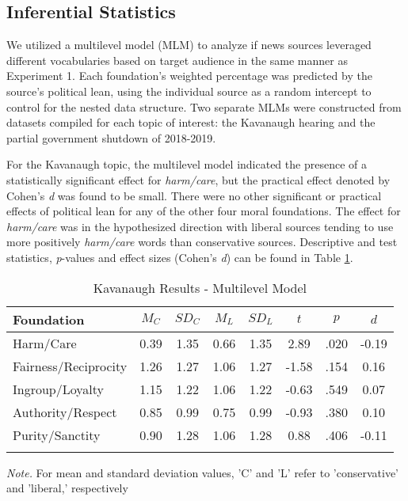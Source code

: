 \documentclass[
  english,
  man,floatsintext]{apa6}
\begin{document}
\hypertarget{inferential-statistics-1}{%
\subsection{Inferential Statistics}\label{inferential-statistics-1}}

We utilized a multilevel model (MLM) to analyze if news sources leveraged different vocabularies based on target audience in the same manner as Experiment 1. Each foundation's weighted percentage was predicted by the source's political lean, using the individual source as a random intercept to control for the nested data structure. Two separate MLMs were constructed from datasets compiled for each topic of interest: the Kavanaugh hearing and the partial government shutdown of 2018-2019.

For the Kavanaugh topic, the multilevel model indicated the presence of a statistically significant effect for \emph{harm/care}, but the practical effect denoted by Cohen's \emph{d} was found to be small. There were no other significant or practical effects of political lean for any of the other four moral foundations. The effect for \emph{harm/care} was in the hypothesized direction with liberal sources tending to use more positively \emph{harm/care} words than conservative sources. Descriptive and test statistics, \emph{p}-values and effect sizes (Cohen's \emph{d}) can be found in Table \ref{tab:exp2-tablekav}.

\begin{table}[h]

\begin{center}
\begin{threeparttable}

\caption{\label{tab:exp2-tablekav}Kavanaugh Results - Multilevel Model}

\footnotesize{

\begin{tabular}{lccccccc}
\toprule
Foundation & $M_C$ & $SD_C$ & $M_L$ & $SD_L$ & $t$ & $p$ & $d$\\
\midrule
Harm/Care & 0.39 & 1.35 & 0.66 & 1.35 & 2.89 & .020 & -0.19\\
Fairness/Reciprocity & 1.26 & 1.27 & 1.06 & 1.27 & -1.58 & .154 & 0.16\\
Ingroup/Loyalty & 1.15 & 1.22 & 1.06 & 1.22 & -0.63 & .549 & 0.07\\
Authority/Respect & 0.85 & 0.99 & 0.75 & 0.99 & -0.93 & .380 & 0.10\\
Purity/Sanctity & 0.90 & 1.28 & 1.06 & 1.28 & 0.88 & .406 & -0.11\\
\bottomrule
\addlinespace
\end{tabular}

}

\begin{tablenotes}[para]
\normalsize{\textit{Note.} For mean and standard deviation values, 'C' and 'L' refer to 'conservative' and 'liberal,' respectively}
\end{tablenotes}

\end{threeparttable}
\end{center}

\end{table}
\end{document}
